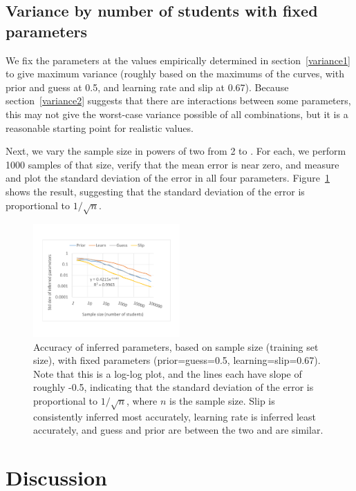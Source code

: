 \documentclass{edm_template}
\begin{document}
\subsection{Variance by number of students with fixed parameters}

We fix the parameters at the values empirically determined in section~\ref{variance1} to give maximum variance (roughly based on the maximums of the curves, with prior and guess at 0.5, and learning rate and slip at 0.67). Because section~\ref{variance2} suggests that there are interactions between some parameters, this may not give the worst-case variance possible of all combinations, but it is a reasonable starting point for realistic values.

Next, we vary the sample size in powers of two from 2 to . For each, we perform 1000 samples of that size, verify that the mean error is near zero, and measure and plot the standard deviation of the error in all four parameters. Figure~\ref{fig:variance3} shows the result, suggesting that the standard deviation of the error is proportional to $1/\sqrt{n}$.

\begin{figure}
\label{fig:variance3}
\centering
\includegraphics[width=0.5\textwidth]{data/variance3.pdf}
\caption{Accuracy of inferred parameters, based on sample size (training set size), with fixed parameters (prior=guess=0.5, learning=slip=0.67). Note that this is a log-log plot, and the lines each have slope of roughly -0.5, indicating that the standard deviation of the error is proportional to $1/\sqrt{n}$, where
$n$ is the sample size. Slip is consistently inferred most accurately, learning rate is inferred least accurately, and guess and prior are between the two and are similar.}
\end{figure}

\section{Discussion}
\end{document}
